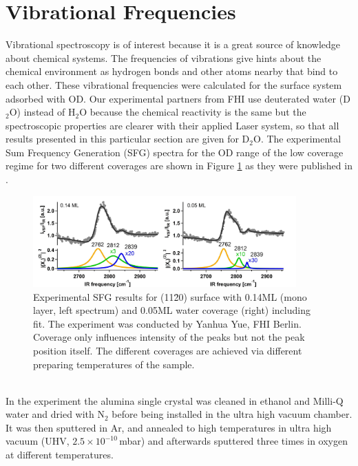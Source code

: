 \documentclass[11pt,DIV=13,BCOR=5mm,a4paper,headinclude]{scrbook}
\begin{document}
\section{Vibrational Frequencies}
Vibrational spectroscopy is of interest because it is a great source of knowledge about chemical systems.
The frequencies of vibrations give hints about the chemical environment as hydrogen bonds and other atoms nearby that bind to each other.
These vibrational frequencies were calculated for the surface system adsorbed with OD.
Our experimental partners from FHI use deuterated water (D$_2$O) instead of H$_2$O because the chemical reactivity is the same but the spectroscopic properties are clearer with their applied Laser system, so that all results presented in this particular section are given for D$_2$O.
The experimental Sum Frequency Generation (SFG) spectra for the OD range of the low coverage regime for two different coverages are shown in Figure \ref{abb:exp-sfg} as they were published in \cite{Heiden11-20_2018}.
\begin{figure}[!ht]
 \centering
\includegraphics[width=0.9\textwidth]{figures/11-20/SFG_fit.jpg}
 \caption{Experimental SFG results for (11\=20) surface with 0.14ML (mono layer, left spectrum) and 0.05ML water coverage (right) including fit.
The experiment was conducted by Yanhua Yue, FHI Berlin.
Coverage only influences intensity of the peaks but not the peak position itself.
The different coverages are achieved via different preparing temperatures of the sample.}
        \label{abb:exp-sfg}
 \end{figure}
\\
In the experiment the alumina single crystal was cleaned in ethanol and Milli-Q water and dried with N$_2$ before being installed in the ultra high vacuum chamber.
It was then sputtered in Ar, and annealed to high temperatures in ultra high vacuum (UHV, $2.5\times 10^{-10}\,$mbar) and afterwards sputtered three times in oxygen at different temperatures.
\end{document}
